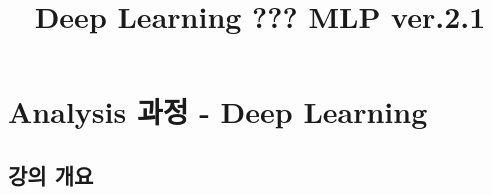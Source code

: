 \documentclass[11pt]{article}
\title{Deep Learning ??? MLP ver.2.1}
\begin{document}
    
    
    \maketitle
    
    

    
    \hypertarget{analysis-uxacfcuxc815---deep-learning}{%
\section{Analysis 과정 - Deep
Learning}\label{analysis-uxacfcuxc815---deep-learning}}

    \hypertarget{uxac15uxc758-uxac1cuxc694}{%
\subsection{강의 개요}\label{uxac15uxc758-uxac1cuxc694}}
\end{document}
